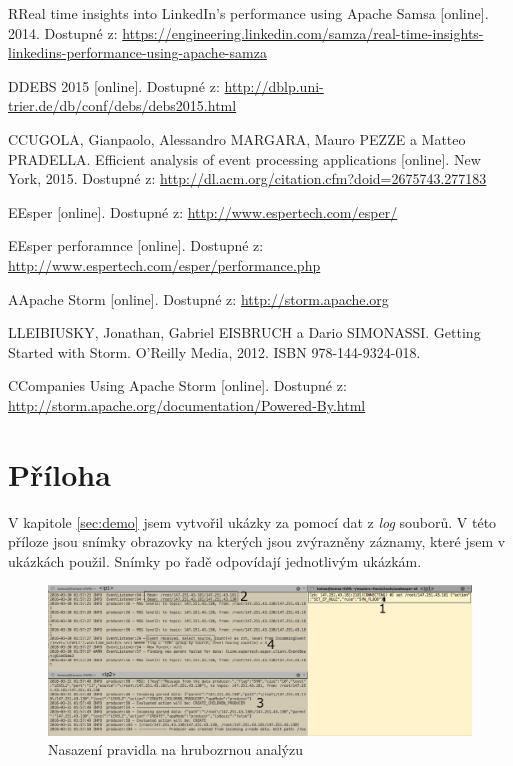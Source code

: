 \documentclass[
  digital, %
  table,   %
  nolof,     %
  nolot,     %
  oneside, %
  nocover,
  monochrome,
  12pt
]{fithesis3}
\begin{document}
\begin{thebibliography}{99}
\bibitem
RReal time insights into LinkedIn's performance using Apache Samsa [online]. 2014. Dostupné z: \url{https://engineering.linkedin.com/samza/real-time-insights-linkedins-performance-using-apache-samza} \label{bib_samsa_case_study}

\bibitem
DDEBS 2015 [online]. Dostupné z: \url{http://dblp.uni-trier.de/db/conf/debs/debs2015.html} \label{bib_debs_conf}

\bibitem
CCUGOLA, Gianpaolo, Alessandro MARGARA, Mauro PEZZE a Matteo PRADELLA. Efficient analysis of event processing applications [online]. New York, 2015. Dostupné z: \url{http://dl.acm.org/citation.cfm?doid=2675743.277183} \label{bib_cave}

\bibitem
EEsper [online]. Dostupné z: \url{http://www.espertech.com/esper/} \label{bib_esper}

\bibitem
EEsper perforamnce [online]. Dostupné z: \url{http://www.espertech.com/esper/performance.php} \label{bib_esper_power}

\bibitem
AApache Storm [online]. Dostupné z: \url{http://storm.apache.org} \label{bib_storm_doc}

\bibitem
LLEIBIUSKY, Jonathan, Gabriel EISBRUCH a Dario SIMONASSI. Getting Started with Storm. O’Reilly Media, 2012. ISBN 978-144-9324-018. \label{bib_storm}

\bibitem
CCompanies Using Apache Storm [online]. Dostupné z: \url{http://storm.apache.org/documentation/Powered-By.html} \label{bib_storm_usage}


\end{thebibliography}
\appendix

\chapter{Příloha}
\label{sec:appendix-a}
V kapitole \ref{sec:demo} jsem vytvořil ukázky za pomocí dat z \textit{log} souborů. V této příloze jsou snímky obrazovky na kterých jsou zvýrazněny záznamy, které jsem v ukázkách použil. Snímky po řadě odpovídají jednotlivým ukázkám.

\begin{figure}[H]
	\centering
    \includegraphics[width=\linewidth, height=.29\textheight]{images/deploy-rule-screen.png}
    \caption{Nasazení pravidla na hrubozrnou analýzu}
    \label{fig:deploy-rule-screen}
\end{figure}
\end{document}
